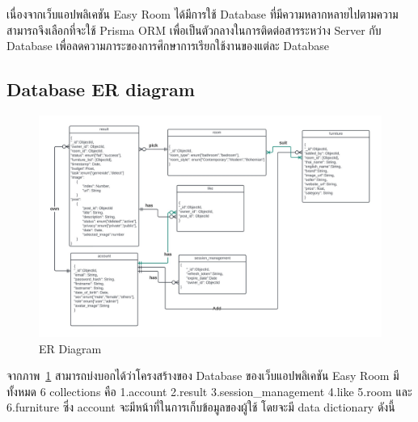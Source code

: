 \documentclass[12pt,oneside,openright,a4paper]{cpe-thai-project}
\begin{document}
\hspace {18pt}เนื่องจากเว็บแอปพลิเคชัน Easy Room ได้มีการใช้ Database ที่มีความหลากหลายไปตามความสามารถจึงเลือกที่จะใช้ Prisma ORM เพื่อเป็นตัวกลางในการติดต่อสารระหว่าง Server กับ Database เพื่อลดความภาระของการศึกษาการเรียกใช้งานของแต่ละ Database

\vspace{\fill}\clearpage

\subsection{Database ER diagram}

\begin{figure}[!h]\centering
\includegraphics{image/er.jpg}
\caption{ER Diagram}
\label{fig:er}
\end{figure}

\hspace {18pt} จากภาพ~\ref{fig:er} สามารถบ่งบอกได้ว่าโครงสร้างของ Database ของเว็บแอปพลิเคชัน Easy Room มีทั้งหมด 6 collections คือ 1.account 2.result 3.session\_management 4.like 5.room และ 6.furniture ซึ่ง account จะมีหน้าที่ในการเก็บข้อมูลของผู้ใช้ โดยจะมี data dictionary ดังนี้




\makeatletter
\g@addto@macro{\UrlBreaks}{\UrlOrds}
\makeatother
% 




 \\
\end{document}
